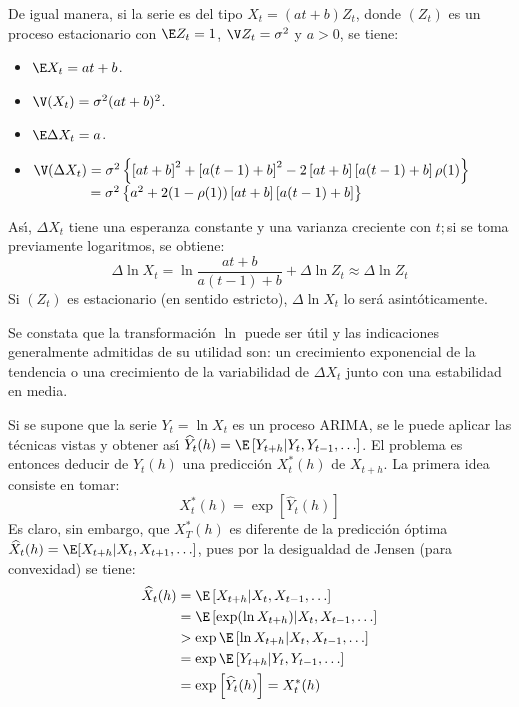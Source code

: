 De igual manera, si la serie es del tipo $X_{t}=(at +b)Z_{t}$, donde $(Z_{t})$ es un proceso estacionario con $\E Z_{t} = 1$, $\V Z_{t}= \sigma^{2}$ y $a> 0$, se tiene:
\begin{itemize}
\item $\E X_{t}  = at+b$.
\item $\V(X_{t}) =\sigma^{2}(at +b)^{2}$.
\item $\E\Delta X_{t} = a$.
\item $\V(\Delta X_{t}) = \sigma^{2}\left\{ {\left[ {at+b} \right]^{2}+\left[ {a(t-1)+b} \right]^{2}-2\left[ {at+b} \right]\left[ {a(t-1)+b} \right]\rho (1)} \right\}$\\ $\phantom{\V(\Delta X_{t}) }=\sigma^{2}\left\{ {a^{2}+2(1-\rho (1))\left[ {at+b} \right]\left[ 
{a(t-1)+b} \right]} \right\}$
\end{itemize}

As\'{\i}, $\Delta X_{t}$ tiene una esperanza constante y una 
varianza creciente con $t; $si se toma previamente logaritmos, se obtiene: 
\[
\Delta \ln X_{t} =\ln \frac{at+b}{a(t-1)+b}+\Delta \ln Z_{t} 
\approx \Delta \ln Z_{t} 
\]
Si $(Z_{t})$ es estacionario (en sentido estricto), $\Delta \ln X_{t}$ lo ser\'{a} asint\'{o}ticamente.

Se constata que la transformaci\'{o}n $\ln$ puede ser \'{u}til y las indicaciones generalmente admitidas de su utilidad son: un crecimiento exponencial de la tendencia o una crecimiento de la variabilidad de $\Delta X_{t}$ 
junto con una estabilidad en media.

Si se supone que la serie $Y_{t} =\ln X_{t} $ es un proceso ARIMA, se le 
puede aplicar las t\'{e}cnicas vistas y obtener as\'{\i} $\widehat{Y} 
_{t} (h)=\E\left[ Y_{t+h} | Y_{t}  ,Y_{t-1} ,\ldots  \right]$. El problema es entonces deducir de $\widehat{Y}_{t} (h)$ una predicci\'{o}n $X_{t}^{\ast } (h)$ de $X_{t+h} $. 
La primera idea consiste en tomar:
\[
X_{t}^{\ast } (h)=\exp \left[ {\widehat{Y} _{t} (h)} \right]
\]
Es claro, sin embargo, que $X_T^{\ast}(h)$ es diferente de la predicci\'{o}n \'{o}ptima $\widehat{X}_t(h)=\E[X_{t+h}|X_t,X_{t+1},\ldots]$, pues por la desigualdad de Jensen (para convexidad) se tiene:
\begin{align*}
\widehat{X} _{t} (h)&=\E\left[ X_{t+h} | X_{t} ,X_{t-1} ,\ldots \right]\\
	&=\E\left[ \exp (\ln X_{t+h}) | X_{t} ,X_{t-1} ,\ldots \right]\\
	&>\exp \E\left[ \ln X_{t+h} | X_{t} ,X_{t-1} ,\ldots  \right]\\
	&=\exp \E\left[ Y_{t+h} | Y_{t} ,Y_{t-1} ,\ldots \right]\\
	&=\exp \left[ \widehat{Y}_{t} (h) \right]=X_{t}^{\ast } (h) 
\end{align*}

